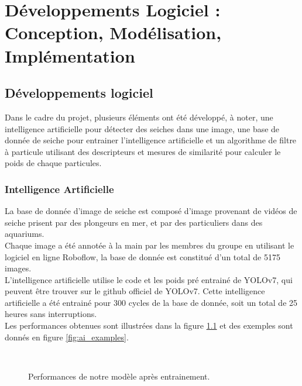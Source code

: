 \chapter{Développements Logiciel : Conception, Modélisation, Implémentation} 

\section{Développements logiciel}
Dans le cadre du projet, plusieurs éléments ont été développé, à noter, une intelligence artificielle pour détecter des seiches dans une image, une base de donnée de seiche pour entrainer l'intelligence artificielle et un algorithme de filtre à particule utilisant des descripteurs et mesures de similarité pour calculer le poids de chaque particules.\\

\subsection{Intelligence Artificielle}
La base de donnée d'image de seiche est composé d'image provenant de vidéos de seiche prisent par des plongeurs en mer, et par des particuliers dans des aquariums.\\
Chaque image a été annotée à la main par les membres du groupe en utilisant le logiciel en ligne Roboflow, la base de donnée est constitué d'un total de 5175 images.\\
L'intelligence artificielle utilise le code et les poids pré entrainé de YOLOv7\cite{wang_yolov7_nodate}, qui peuvent être trouver sur le github officiel de YOLOv7\cite{yolov7_github}.
Cette intelligence artificielle a été entrainé pour 300 cycles de la base de donnée, soit un total de 25 heures sans interruptions.\\
Les performances obtenues sont illustrées dans la figure \ref{fig:ai_results} et des exemples sont donnés en figure \ref{fig:ai_examples}.\\

\begin{figure}[!htbp]
\center
	\\
\caption{Performances de notre modèle après entrainement.}
\label{fig:ai_results}
\end{figure}
\FloatBarrier

